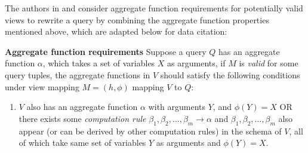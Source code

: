 The authors in \cite{cohen2006user} and \cite{cohen2006rewriting} consider aggregate function requirements for potentially valid views to rewrite a query by combining the aggregate function properties mentioned above, which are adapted below for data citation:

\begin{definition}\label{Def: conditions_for_agg_functions}
{\bf Aggregate function requirements}
Suppose a query $Q$ has an aggregate function $\alpha$, which takes a set of variables $X$ as arguments, if $M$ is {\em valid} for some query tuples, the aggregate functions in $V$ should satisfy the following conditions under view mapping $M = (h, \phi)$ mapping $V$ to $Q$:
\begin{enumerate}
\item $V$ %
also has an aggregate function $\alpha$ with arguments $Y$, and $\phi(Y) = X$ OR there exists some {\em computation rule} $\beta_1, \beta_2, \dots, \beta_m \rightarrow \alpha$ and $\beta_1, \beta_2, \dots, \beta_m$ also appear (or can be derived by other computation rules) in the schema of $V$, all of which take same set of variables $Y$ as arguments and $\phi(Y) = X$.

\end{enumerate}
\end{definition}

